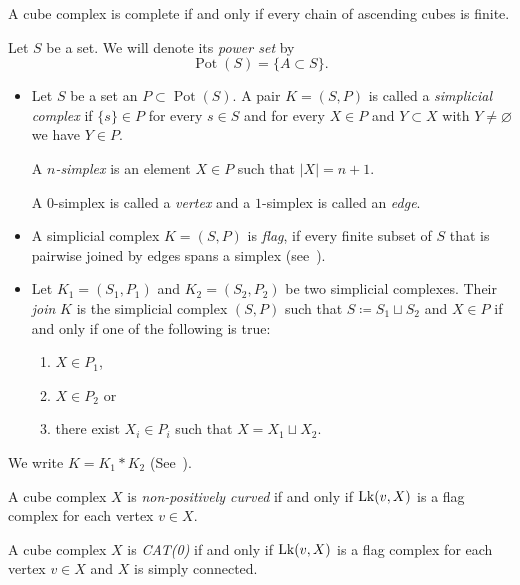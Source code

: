 \begin{thm}
  A cube complex is complete if and only if every chain of ascending cubes is finite.
\end{thm}

\begin{notation}
  Let \(S\) be a set. We will denote its \emph{power set} by
  \[
    \operatorname{Pot}(S) = \{A \subset S\}.
  \]
\end{notation}

\begin{defin}
  \label{defin:flag}
  \begin{itemize}
  \item
    Let \(S\) be a set an \(P \subset \operatorname{Pot}(S)\). A pair \(K = (S, P)\) is called a \emph{simplicial complex} if \(\{s\} \in P\) for every \(s \in S\) and for every \(X \in P\) and \(Y \subset X\) with \(Y \neq \varnothing\) we have \(Y \in P\).

    A \emph{\(n\)-simplex} is an element \(X \in P\) such that \(|X| = n+1\).

    A \(0\)-simplex is called a \emph{vertex} and a \(1\)-simplex is called an \emph{edge}.
  \item
    A simplicial complex \(K = (S,P)\) is \emph{flag}, if every finite subset of \(S\) that is pairwise joined by edges spans a simplex (see\ \cite[Definition II.5.15]{MR1744486}).
  \item Let \(K_1 = (S_1, P_1)\) and \(K_2 = (S_2, P_2)\) be two simplicial complexes. Their \emph{join} \(K\) is the simplicial complex \((S,P)\) such that \(S \coloneqq S_1 \sqcup S_2\) and \(X \in P\) if and only if one of the following is true:
    \begin{enumerate}
    \item \(X \in P_1\),
    \item \(X \in P_2\) or
    \item there exist \(X_i \in P_i\) such that \(X = X_1 \sqcup X_2\).
    \end{enumerate}
  \end{itemize}
  We write \(K = K_1 \ast K_2\) (See\ \cite[Definition~I.7A.2]{MR1744486}).
\end{defin}

\begin{thm}
  \label{thm:link}
  A cube complex \(X\) is \emph{non-positively curved} if and only if \(\operatorname{Lk}(v,X)\) is a flag complex for each vertex \(v \in X\).

  A cube complex \(X\) is \emph{CAT(0)} if and only if \(\operatorname{Lk}(v,X)\)  is a flag complex for each vertex \(v \in X\) and \(X\) is simply connected.
\end{thm}

